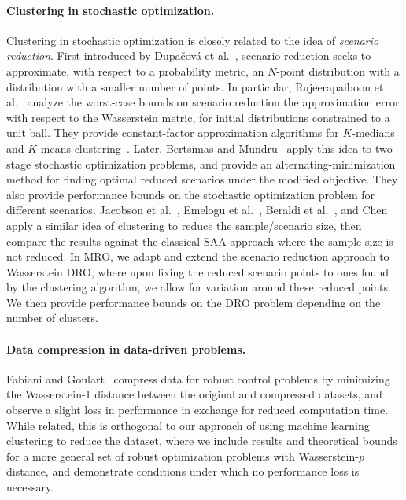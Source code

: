 \documentclass[12pt]{article}
\newcommand{\citep}{\cite}
\theoremstyle{thmstyleone}%
\theoremstyle{thmstyletwo}%
\theoremstyle{thmstylethree}%
\begin{document}
\paragraph{Clustering in stochastic optimization.}
Clustering in stochastic optimization is closely related to the idea of {\it scenario reduction}.
First introduced by Dupa{\v c}ov{\'a} et al.~\cite{dupavcova2003scenario}, scenario reduction seeks to approximate, with respect to a probability metric, an $N$-point distribution with a distribution with a smaller number of points.
In particular, Rujeerapaiboon et al.~\cite{scen_k} analyze the worst-case bounds on scenario reduction the approximation error with respect to the Wasserstein metric, for initial distributions constrained to a unit ball.
They provide constant-factor approximation algorithms for $K$-medians and $K$-means clustering~\citep{kmeans}.
Later, Bertsimas and Mundru~\cite{bertsimas2023optimization} apply this idea to two-stage stochastic optimization problems, and provide an alternating-minimization method for finding optimal reduced scenarios under the modified objective.
They also provide performance bounds on the stochastic optimization problem for different scenarios.
Jacobson et al.~\citep{SAA1}, Emelogu et al.~\cite{SAA2}, Beraldi et al.~\cite{SAA3}, and Chen \cite{SAA4} apply a similar idea of clustering to reduce the sample/scenario size, then compare the results against the classical \gls{SAA} approach where the sample size is not reduced.
In \gls{MRO}, we adapt and extend the scenario reduction approach to Wasserstein \gls{DRO}, where upon fixing the reduced scenario points to ones found by the clustering algorithm, we allow for variation around these reduced points.
We then provide performance bounds on the \gls{DRO} problem depending on the number of clusters.

\paragraph{Data compression in data-driven problems.}
Fabiani and Goulart~\cite{data-comp} compress data for robust control problems by minimizing the Wasserstein-1 distance between the original and compressed datasets, and observe a slight loss in performance in exchange for reduced computation time. While related, this is orthogonal to our approach of using machine learning clustering to reduce the dataset, where we include results and theoretical bounds for a more general set of robust optimization problems with Wasserstein-$p$ distance, and demonstrate conditions under which no performance loss is necessary.
\end{document}
